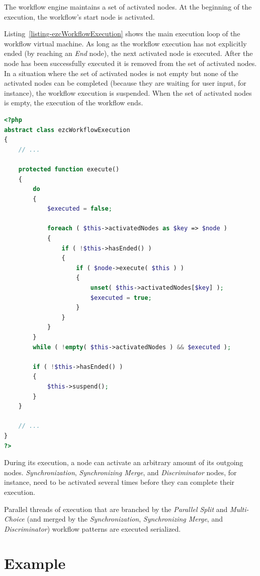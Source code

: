 The workflow engine maintains a set of activated nodes. At the beginning of
the execution, the workflow's start node is activated.

Listing~\ref{listing-ezcWorkflowExecution} shows the main execution loop of
the workflow virtual machine. As long as the workflow execution has not
explicitly ended (by reaching an \emph{End} node), the next activated node
is executed. After the node has been successfully executed it is removed from
the set of activated nodes. In a situation where the set of activated nodes
is not empty but none of the activated nodes can be completed (because they are
waiting for user input, for instance), the workflow execution is suspended.
When the set of activated nodes is empty, the execution of the workflow ends.

\begin{lstlisting}[language=PHP,float,caption={The workflow engine's main execution loop},label=listing-ezcWorkflowExecution]
<?php
abstract class ezcWorkflowExecution
{
    // ...

    protected function execute()
    {
        do
        {
            $executed = false;

            foreach ( $this->activatedNodes as $key => $node )
            {
                if ( !$this->hasEnded() )
                {
                    if ( $node->execute( $this ) )
                    {
                        unset( $this->activatedNodes[$key] );
                        $executed = true;
                    }
                }
            }
        }
        while ( !empty( $this->activatedNodes ) && $executed );

        if ( !$this->hasEnded() )
        {
            $this->suspend();
        }
    }

    // ...
}
?>
\end{lstlisting}

During its execution, a node can activate an arbitrary amount of its outgoing
nodes. \emph{Synchronization}, \emph{Synchronizing Merge}, and
\emph{Discriminator} nodes, for instance, need to be activated several times
before they can complete their execution.

Parallel threads of execution that are branched by the \emph{Parallel Split}
and \emph{Multi-Choice} (and merged by the \emph{Synchronization},
\emph{Synchronizing Merge}, and \emph{Discriminator}) workflow patterns are
executed serialized.

\clearpage
\section{Example}
\label{section-Example}

